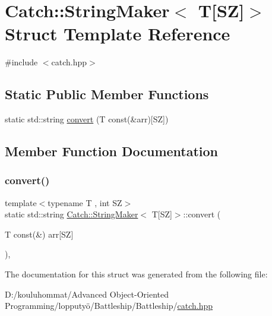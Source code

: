 \hypertarget{struct_catch_1_1_string_maker_3_01_t[_s_z]_4}{}\section{Catch\+:\+:String\+Maker$<$ T\mbox{[}SZ\mbox{]}$>$ Struct Template Reference}
\label{struct_catch_1_1_string_maker_3_01_t[_s_z]_4}


{\ttfamily \#include $<$catch.\+hpp$>$}

\subsection*{Static Public Member Functions}
\begin{DoxyCompactItemize}
\item 
static std\+::string \mbox{\hyperlink{struct_catch_1_1_string_maker_3_01_t[_s_z]_4_a3698cea2c24d8649ec9ecb5fa679eeb7}{convert}} (T const(\&arr)\mbox{[}SZ\mbox{]})
\end{DoxyCompactItemize}


\subsection{Member Function Documentation}
\mbox{\label{struct_catch_1_1_string_maker_3_01_t[_s_z]_4_a3698cea2c24d8649ec9ecb5fa679eeb7}} 
\subsubsection{\texorpdfstring{convert()}{convert()}}
{\footnotesize\ttfamily template$<$typename T , int SZ$>$ \\
static std\+::string \mbox{\hyperlink{struct_catch_1_1_string_maker}{Catch\+::\+String\+Maker}}$<$ T\mbox{[}SZ\mbox{]}$>$\+::convert (\begin{DoxyParamCaption}\item[{T const(\&)}]{arr\mbox{[}\+S\+Z\mbox{]} }\end{DoxyParamCaption})\hspace{0.3cm}{\ttfamily [inline]}, {\ttfamily [static]}}



The documentation for this struct was generated from the following file\+:\begin{DoxyCompactItemize}
\item 
D\+:/kouluhommat/\+Advanced Object-\/\+Oriented Programming/lopputyö/\+Battleship/\+Battleship/\mbox{\hyperlink{catch_8hpp}{catch.\+hpp}}\end{DoxyCompactItemize}
